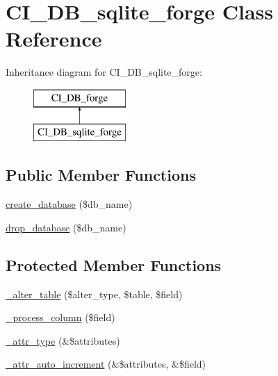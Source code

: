 \hypertarget{class_c_i___d_b__sqlite__forge}{}\section{C\+I\+\_\+\+D\+B\+\_\+sqlite\+\_\+forge Class Reference}
\label{class_c_i___d_b__sqlite__forge}
Inheritance diagram for C\+I\+\_\+\+D\+B\+\_\+sqlite\+\_\+forge\+:\begin{figure}[H]
\begin{center}
\leavevmode
\includegraphics[height=2.000000cm]{class_c_i___d_b__sqlite__forge}
\end{center}
\end{figure}
\subsection*{Public Member Functions}
\begin{DoxyCompactItemize}
\item 
\mbox{\hyperlink{class_c_i___d_b__sqlite__forge_a902a7267babceb2ce595706f217e00ad}{create\+\_\+database}} (\$db\+\_\+name)
\item 
\mbox{\hyperlink{class_c_i___d_b__sqlite__forge_a9612987b2d4230de2638d15857e92e67}{drop\+\_\+database}} (\$db\+\_\+name)
\end{DoxyCompactItemize}
\subsection*{Protected Member Functions}
\begin{DoxyCompactItemize}
\item 
\mbox{\hyperlink{class_c_i___d_b__sqlite__forge_a41c6cae02f2fda8b429ad0afb9509426}{\+\_\+alter\+\_\+table}} (\$alter\+\_\+type, \$table, \$field)
\item 
\mbox{\hyperlink{class_c_i___d_b__sqlite__forge_a8f38f1c5b5dddecca4befbe393f3f299}{\+\_\+process\+\_\+column}} (\$field)
\item 
\mbox{\hyperlink{class_c_i___d_b__sqlite__forge_a8553be952084c6f7cdfff370a1d14f6b}{\+\_\+attr\+\_\+type}} (\&\$attributes)
\item 
\mbox{\hyperlink{class_c_i___d_b__sqlite__forge_a2a013a5932439c3c44f0dad3436525f7}{\+\_\+attr\+\_\+auto\+\_\+increment}} (\&\$attributes, \&\$field)
\end{DoxyCompactItemize}
